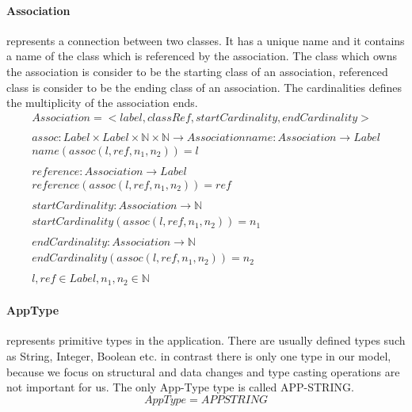 \documentclass[11pt]{article}
\begin{document}
\paragraph {Association} represents a connection between two classes. It has a unique name and it contains a name of the class which is referenced by the association. The class which owns the association is consider to be the starting class of an association, referenced class is consider to be the ending class of an association. The cardinalities defines the multiplicity of the association ends.
\begin{gather*}
Association = <label, classRef, startCardinality, endCardinality> \\ \\
assoc : Label \times Label \times \mathbb{N} \times \mathbb{N} \rightarrow Association
name : Association \rightarrow Label \\
name(assoc(l, ref, n_1, n_2)) = l\\ \\
reference : Association \rightarrow Label \\
reference(assoc(l, ref, n_1, n_2)) = ref\\ \\
startCardinality : Association \rightarrow \mathbb{N} \\
startCardinality(assoc(l, ref, n_1, n_2)) = n_1\\ \\
endCardinality : Association \rightarrow \mathbb{N} \\
endCardinality(assoc(l, ref, n_1, n_2)) = n_2 \\ \\
l, ref \in Label,  n_1, n_2 \in \mathbb{N}
\end{gather*}



\paragraph{AppType} represents primitive types in the application. There are usually defined types such as String, Integer, Boolean etc. in contrast there is only one type in our model, because we focus on structural and data changes and type casting operations are not important for us. The only App-Type type is called APP-STRING.
$$
AppType = APPSTRING
$$
\end{document}

